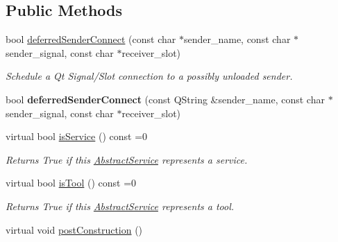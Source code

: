 \subsection*{Public Methods}
\begin{DoxyCompactItemize}
\item 
\mbox{\label{classrev_1_1_abstract_service_acc4ccafd89c3d4d00a9838b6090ea72a}} 
bool \mbox{\hyperlink{classrev_1_1_abstract_service_acc4ccafd89c3d4d00a9838b6090ea72a}{deferred\+Sender\+Connect}} (const char $\ast$sender\+\_\+name, const char $\ast$sender\+\_\+signal, const char $\ast$receiver\+\_\+slot)
\begin{DoxyCompactList}\small\item\em Schedule a Qt Signal/\+Slot connection to a possibly unloaded sender. \end{DoxyCompactList}\item 
\mbox{\label{classrev_1_1_abstract_service_af59a2d40b323da43ad69ea9b1634a228}} 
bool {\bfseries deferred\+Sender\+Connect} (const Q\+String \&sender\+\_\+name, const char $\ast$sender\+\_\+signal, const char $\ast$receiver\+\_\+slot)
\item 
\mbox{\label{classrev_1_1_abstract_service_a2ee1ad1b9d10a1d702d0a484e214b99d}} 
virtual bool \mbox{\hyperlink{classrev_1_1_abstract_service_a2ee1ad1b9d10a1d702d0a484e214b99d}{is\+Service}} () const =0
\begin{DoxyCompactList}\small\item\em Returns True if this \mbox{\hyperlink{classrev_1_1_abstract_service}{Abstract\+Service}} represents a service. \end{DoxyCompactList}\item 
\mbox{\label{classrev_1_1_abstract_service_aeb245a6d33601ccb842f4c7c2a3dda7a}} 
virtual bool \mbox{\hyperlink{classrev_1_1_abstract_service_aeb245a6d33601ccb842f4c7c2a3dda7a}{is\+Tool}} () const =0
\begin{DoxyCompactList}\small\item\em Returns True if this \mbox{\hyperlink{classrev_1_1_abstract_service}{Abstract\+Service}} represents a tool. \end{DoxyCompactList}\item 
virtual void \mbox{\hyperlink{classrev_1_1_abstract_service_a23dfd75f11839483f0f75b08b2b3d502}{post\+Construction}} ()

\end{DoxyCompactItemize}
